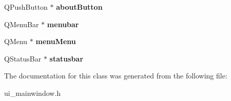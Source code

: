 \begin{DoxyCompactItemize}
\item 
\hypertarget{class_ui___main_window_ad25d7acd430daf05ee3459c1cba9af69}{
QPushButton $\ast$ {\bfseries aboutButton}}
\label{class_ui___main_window_ad25d7acd430daf05ee3459c1cba9af69}

\item 
\hypertarget{class_ui___main_window_adf43d9a67adaec750aaa956b5e082f09}{
QMenuBar $\ast$ {\bfseries menubar}}
\label{class_ui___main_window_adf43d9a67adaec750aaa956b5e082f09}

\item 
\hypertarget{class_ui___main_window_a6d7bbbef44e207ee15e5a623171033a2}{
QMenu $\ast$ {\bfseries menuMenu}}
\label{class_ui___main_window_a6d7bbbef44e207ee15e5a623171033a2}

\item 
\hypertarget{class_ui___main_window_a1687cceb1e2787aa1f83e50433943a91}{
QStatusBar $\ast$ {\bfseries statusbar}}
\label{class_ui___main_window_a1687cceb1e2787aa1f83e50433943a91}

\end{DoxyCompactItemize}


The documentation for this class was generated from the following file:\begin{DoxyCompactItemize}
\item 
ui\_\-mainwindow.h\end{DoxyCompactItemize}
